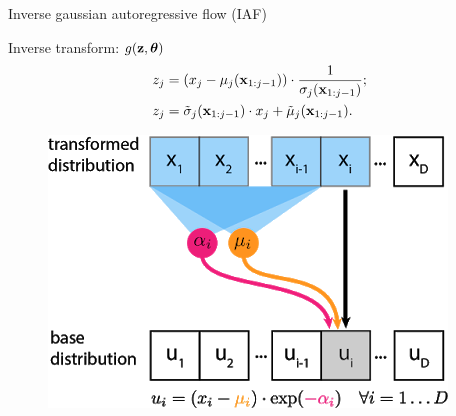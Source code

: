 \begin{frame}{Inverse gaussian autoregressive flow (IAF)}
	\begin{minipage}[t]{0.65\columnwidth}
		\begin{block}{Inverse transform: $g(\mathbf{z}, \boldsymbol{\theta})$}
			\vspace{-0.5cm}
			\begin{align*}
				z_j &= (x_j - \mu_j(\mathbf{x}_{1:j-1})) \cdot \frac{1}{\sigma_j (\mathbf{x}_{1:j-1}) }; \\
				z_j &= \tilde{\sigma}_j (\mathbf{x}_{1:j-1}) \cdot x_j + \tilde{\mu}_j(\mathbf{x}_{1:j-1}).
			\end{align*}
			\vspace{-0.4cm}
		\end{block}
	\end{minipage}%
	\begin{minipage}[t]{0.35\columnwidth}
		\begin{figure}[h]
			\centering
			\includegraphics[width=.9\linewidth]{figs/af_iaf_explained_2.png}
		\end{figure}
	\end{minipage}\\
	\vspace{0.1cm}
	

\end{frame}
